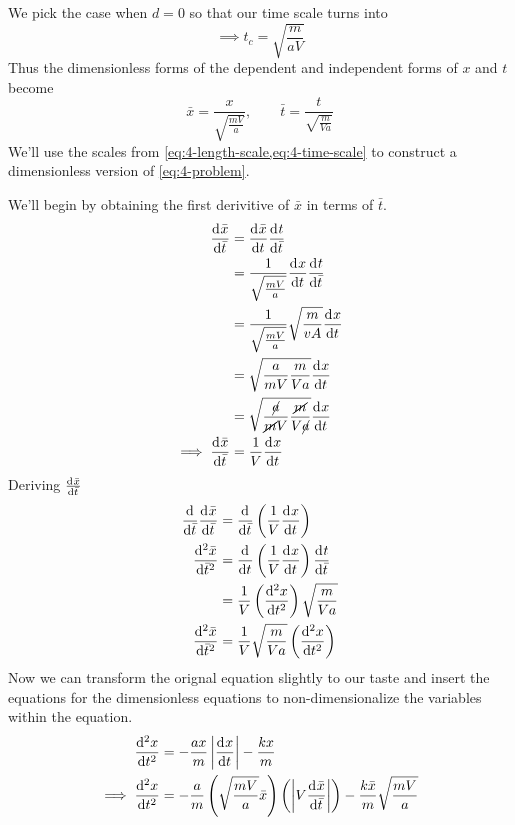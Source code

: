 \documentclass[12pt]{article}
\begin{document}
We pick the case when $d=0$ so that our time scale turns into
\begin{equation}
  \label{eq:4-time-scale}
  \implies t_c = \sqrt{\frac{m}{aV}}
\end{equation}
Thus the dimensionless forms of the dependent and independent forms of $x$ and
$t$ become
\begin{equation}
  \bar{x} = \frac{x}{\sqrt{\frac{mV}{a}}}, \qquad
  \bar{t} = \frac{t}{\sqrt{\frac{m}{Va}}}
\end{equation}
We'll use the scales from \cref{eq:4-length-scale,eq:4-time-scale} to construct
a dimensionless version of \cref{eq:4-problem}.

We'll begin by obtaining the first derivitive of $\bar{x}$ in terms of
$\bar{t}$.
\begin{equation}
  \begin{aligned}
    \od{\bar{x}}{\bar{t}} &= \od{\bar{x}}{t}\od{t}{\bar{t}} \\
    &= \frac{1}{\sqrt{\frac{mV}{a}}}\od{x}{t}\od{t}{\bar{t}} \\
    &= \frac{1}{\sqrt{\frac{mV}{a}}}\sqrt{\frac{m}{vA}}\od{x}{t} \\
    &= \sqrt{\frac{a}{mV}\frac{m}{Va}} \od{x}{t} \\
    &= \sqrt{\frac{\cancel{a}}{\cancel{m}V}\frac{\cancel{m}}{V\cancel{a}}}
    \od{x}{t} \\
    \implies \od{\bar{x}}{\bar{t}} &= \frac{1}{V}\od{x}{t} \\
  \end{aligned}
\end{equation}
Deriving $\od{\bar{x}}{\bar{t}}$
\begin{equation}
  \begin{aligned}
    \od{}{\bar{t}}\od{\bar{x}}{\bar{t}} &= \od{}{\bar{t}} \left(\frac{1}{V}\od{x}{t}\right) \\
    \od[2]{\bar{x}}{\bar{t}} &= \od{}{t}
    \left(\frac{1}{V}\od{x}{t}\right) \od{t}{\bar{t}} \\
    &= \frac{1}{V} \left(\od[2]{x}{t}\right) \sqrt{\frac{m}{Va}} \\
    \od[2]{\bar{x}}{\bar{t}} &= \frac{1}{V}\sqrt{\frac{m}{Va}} \left(\od[2]{x}{t}\right) \\
  \end{aligned}
\end{equation}
Now we can transform the orignal equation slightly to our
taste and insert the equations for the dimensionless equations to
non-dimensionalize the variables within the equation.
\begin{equation}
  \label{eq:4-equation}
  \begin{aligned}
    \od[2]{x}{t} &= -\frac{ax}{m} \abs{\od{x}{t}} - \frac{kx}{m} \\
    \implies \od[2]{x}{t} &= -\frac{a}{m}\left( \sqrt{\frac{mV}{a}}\bar{x}\right)
    \left( \abs{V\od{\bar{x}}{\bar{t}}}\right) -
    \frac{k\bar{x}}{m}\sqrt{\frac{mV}{a}} \\
  \end{aligned}
\end{equation}
\end{document}
